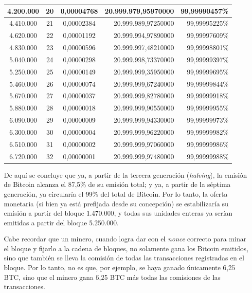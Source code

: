 \documentclass[12pt,a4paper,twoside]{book}
\begin{document}
\begin{footnotesize}
\begin{longtable}{|c|c|c|r|r|}
4.200.000 & 20 & 0,00004768 & 20.999.979,95970000 & 99,99990457\% \\ \hline
4.410.000 & 21 & 0,00002384 & 20.999.989,97250000 & 99,99995225\% \\ \hline
4.620.000 & 22 & 0,00001192 & 20.999.994,97890000 & 99,99997609\% \\ \hline
4.830.000 & 23 & 0,00000596 & 20.999.997,48210000 & 99,99998801\% \\ \hline
5.040.000 & 24 & 0,00000298 & 20.999.998,73370000 & 99,99999397\% \\ \hline
5.250.000 & 25 & 0,00000149 & 20.999.999,35950000 & 99,99999695\% \\ \hline
5.460.000 & 26 & 0,00000074 & 20.999.999,67240000 & 99,99999844\% \\ \hline
5.670.000 & 27 & 0,00000037 & 20.999.999,82780000 & 99,99999918\% \\ \hline
5.880.000 & 28 & 0,00000018 & 20.999.999,90550000 & 99,99999955\% \\ \hline
6.090.000 & 29 & 0,00000009 & 20.999.999,94330000 & 99,99999973\% \\ \hline
6.300.000 & 30 & 0,00000004 & 20.999.999,96220000 & 99,99999982\% \\ \hline
6.510.000 & 31 & 0,00000002 & 20.999.999,97060000 & 99,99999986\% \\ \hline
6.720.000 & 32 & 0,00000001 & 20.999.999,97480000 & 99,99999988\% \\ \hline
\end{longtable}
\end{footnotesize}

De aquí se concluye que ya, a partir de la tercera generación (\textit{halving}), la emisión de Bitcoin alcanza el 87,5\% de su emisión total; y ya, a partir de la séptima generación, ya circularía el 99\% del total de Bitcoin. Por lo tanto, la oferta monetaria (si bien ya está prefijada desde su concepción) se  estabilizaría su emisión a partir del bloque 1.470.000, y todas sus unidades enteras ya serían emitidas a partir del bloque 5.250.000.

Cabe recordar que un minero, cuando logra dar con el \textit{nonce} correcto para minar el bloque y fijarlo a la cadena de bloques, no solamente gana los Bitcoin emitidos, sino que también se lleva la comisión de todas las transacciones registradas en el bloque. Por lo tanto, no es que, por ejemplo, se haya ganado únicamente 6,25 BTC, sino que el minero gana 6,25 BTC más todas las comisiones de las transacciones.
\end{document}
